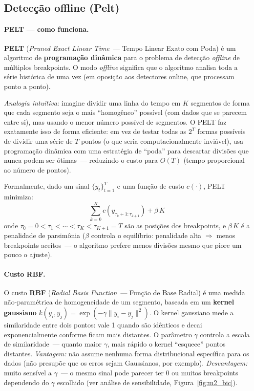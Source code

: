 \documentclass[11pt,a4paper]{article}
\begin{document}
\subsection{Detec\c{c}\~ao offline (Pelt)}
\label{sec:m2_pelt}

\paragraph{PELT --- como funciona.}
\textbf{PELT} (\emph{Pruned Exact Linear Time}~--- Tempo Linear Exato com Poda) \cite{killick2012} \'e um algoritmo de \textbf{programa\c{c}\~ao din\^amica} para o problema de detec\c{c}\~ao \emph{offline} de m\'ultiplos breakpoints. O modo \emph{offline} significa que o algoritmo analisa toda a s\'erie hist\'orica de uma vez (em oposi\c{c}\~ao aos detectores online, que processam ponto a ponto).

\emph{Analogia intuitiva:} imagine dividir uma linha do tempo em $K$ segmentos de forma que cada segmento seja o mais ``homog\^eneo'' poss\'ivel (com dados que se parecem entre si), mas us\-an\-do o menor n\'umero poss\'ivel de segmentos. O PELT faz exatamente isso de forma eficiente: em vez de testar todas as $2^T$ formas poss\'iveis de dividir uma s\'erie de $T$ pontos (o que seria computacionalmente invi\'avel), usa programa\c{c}\~ao din\^amica com uma estrat\'egia de ``poda'' para descartar divis\~oes que nunca podem ser \'otimas~--- reduzindo o custo para $O(T)$ (tempo proporcional ao n\'umero de pontos).

Formalmente, dado um sinal $\{y_t\}_{t=1}^T$ e uma fun\c{c}\~ao de custo $c(\cdot)$, PELT minimiza:
\[
\sum_{k=0}^{K} c\!\left(y_{\tau_k+1:\tau_{k+1}}\right) + \beta\,K
\]
onde $\tau_0 = 0 < \tau_1 < \cdots < \tau_K < \tau_{K+1} = T$ s\~ao as posi\c{c}\~oes dos breakpoints, e $\beta\,K$ \'e a penalidade de parsim\^onia ($\beta$ controla o equil\'ibrio: penalidade alta $\Rightarrow$ menos breakpoints aceitos~--- o algoritmo prefere menos divis\~oes mesmo que piore um pouco o ajuste).

\paragraph{Custo RBF.}
O custo \textbf{RBF} (\emph{Radial Basis Function}~--- Fun\c{c}\~ao de Base Radial) \cite{ruptures} \'e uma medida n\~ao-param\'etrica de homogeneidade de um segmento, baseada em um \textbf{kernel gaussiano} $k(y_i,y_j)\!=\!\exp(-\gamma\|y_i-y_j\|^2)$. O kernel gaussiano mede a similaridade entre dois pontos: vale 1 quando s\~ao id\^enticos e decai exponencialmente conforme ficam mais distantes. O par\^ametro $\gamma$ controla a escala de similaridade~--- quanto maior $\gamma$, mais r\'apido o kernel ``esquece'' pontos distantes. \emph{Vantagem:} n\~ao assume nenhuma forma distribucional espec\'ifica para os dados (n\~ao presup\~oe que os erros sejam Gaussianos, por exemplo). \emph{Desvantagem:} muito sens\'ivel a $\gamma$~--- o mesmo sinal pode parecer ter 0 ou muitos breakpoints dependendo do $\gamma$ escolhido (ver an\'alise de sensibilidade, Figura~\ref{fig:m2_bic}).
\end{document}
